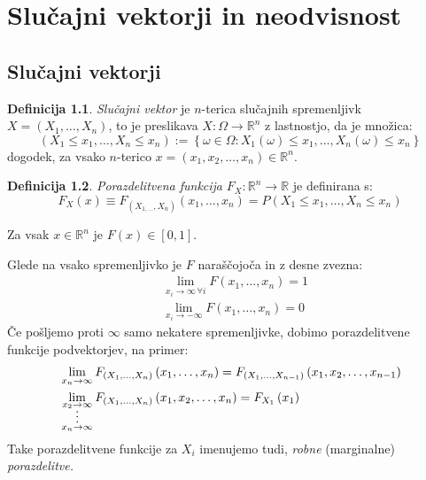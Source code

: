 \documentclass[12pt]{book}
\def\n{\noindent}
\theoremstyle{definition}
\newtheorem{definicija}{Definicija}
\theoremstyle{plain}
\theoremstyle{plain}
\theoremstyle{plain}
\theoremstyle{remark}
\edef\x{\pgfmathresult}%
\begin{document}
\chapter{Slučajni vektorji in neodvisnost}

\section{Slučajni vektorji}

\begin{definicija}
    \emph{Slučajni vektor} je $n$-terica slučajnih spremenljivk $X=\left(X_1, \ldots, X_n\right)$, to je preslikava $X:\Omega \to \mathbb{R}^n$ z lastnostjo, da je množica: 
    $$
    \left(X_1 \leq x_1, \ldots, X_n \leq x_n\right):=\left\{\omega \in \Omega: X_1(\omega) \leq x_1,\ldots, X_n(\omega) \leq x_n\right\}
    $$
    dogodek, za vsako $n$-terico $x=\left(x_1, x_2, \ldots, x_n\right) \in \mathbb{R}^n$.
\end{definicija}

\begin{definicija}
    \emph{Porazdelitvena funkcija} $F_X: \mathbb{R}^n \to \mathbb{R}$ je definirana s:
    $$
    F_X(x) \equiv F_{\left(X_{1, \ldots}, X_n\right)}\left(x_1, \ldots, x_n\right)=P\left(X_1 \leq x_1, \ldots, X_n \leq x_n\right)
    $$
\end{definicija}

\n Za vsak $x \in \mathbb{R}^n$ je $F(x) \in[0, 1]$.

\n Glede na vsako spremenljivko je $F$ naraščojoča in z desne zvezna:
$$
\begin{aligned}
    &\lim _{x_i \to \infty \, \forall i} F\left(x_1, \ldots, x_n\right)=1 \\
    &\lim _{x_i \rightarrow-\infty} F\left(x_1, \ldots, x_n\right)=0
\end{aligned}
$$
Če pošljemo proti $\infty$ samo nekatere spremenljivke, dobimo porazdelitvene funkcije podvektorjev, na primer:
$$
\begin{aligned}
    &\lim _{x_n \to \infty} F_{\left(X_1, \ldots, X_{n}\right)}\left(x_1, \dots , x_n\right)=F_{\left(X_1, \ldots, X_{n-1}\right)}\left(x_1, x_2, \ldots, x_{n-1}\right) \\
    &\lim _{\substack{x_2 \to \infty \vspace{-5pt} \\ \vdots \\x_n \to \infty}} F_{\left(X_1, \ldots, X_{n}\right)}\left(x_1, x_2, \ldots, x_n\right)=F_{X_1}\left(x_1\right)
\end{aligned}
$$
Take porazdelitvene funkcije za $X_i$ imenujemo tudi, \emph{robne} (marginalne) \emph{porazdelitve.}
\end{document}
